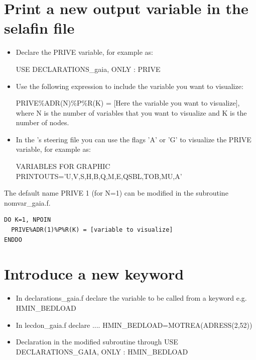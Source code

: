 {%
\section{Print a new output variable in the selafin file}
\begin{itemize}
\item Declare the {\ttfamily PRIVE} variable, for example as:

{\ttfamily USE DECLARATIONS\_gaia, ONLY : PRIVE}

\item Use the following expression to include the variable you want to visualize:

{\ttfamily PRIVE\%ADR(N)\%P\%R(K) = [Here the variable you want to visualize]}, where {\ttfamily N} is the number of variables that you want to visualize and {\ttfamily K} is the number of nodes.

\item In the \gaia's steering file you can use the flags {\ttfamily'A'} or {\ttfamily'G'} to visualize the {\ttfamily PRIVE} variable, for example as:

{\ttfamily VARIABLES FOR GRAPHIC PRINTOUTS='U,V,S,H,B,Q,M,E,QSBL,TOB,MU,A'}
\end{itemize}

The default name {\ttfamily PRIVE 1} (for {\ttfamily N=1}) can be modified in the subroutine {\ttfamily nomvar\_gaia.f}.

\begin{lstlisting}[frame=trBL]
DO K=1, NPOIN
  PRIVE%ADR(1)%P%R(K) = [variable to visualize]
ENDDO
\end{lstlisting}

\section{Introduce a new keyword}
\begin{itemize}
\item In {\ttfamily declarations\_gaia.f} declare the variable to be called from a keyword e.g. {\ttfamily HMIN\_BEDLOAD}
\item In {\ttfamily lecdon\_gaia.f} declare .... {\ttfamily HMIN\_BEDLOAD=MOTREA(ADRESS(2,52))}
\item Declaration in the modified subroutine through {\ttfamily USE DECLARATIONS\_GAIA, ONLY : HMIN\_BEDLOAD}
\end{itemize}


}
